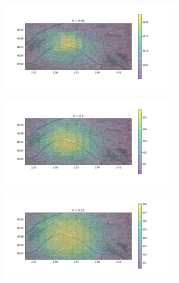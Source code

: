 \documentclass[a4paper,12pt]{article}
\begin{document}
\begin{figure}[h!]
\caption{Parzen comme fonction de Noyau}
\label{fig:tme2_parzen}
\begin{subfigure}{.24\textwidth}
	\centering
	\includegraphics[width=\linewidth]{images/tme2/atms_parzen_0.png}
\end{subfigure}%
\begin{subfigure}{.24\textwidth}
  \centering
	\includegraphics[width=\linewidth]{images/tme2/atms_parzen_1.png}
\end{subfigure}
\begin{subfigure}{.24\textwidth}
  \centering
	\includegraphics[width=\linewidth]{images/tme2/atms_parzen_2.png}

\end{subfigure}
\end{figure}
\end{document}
